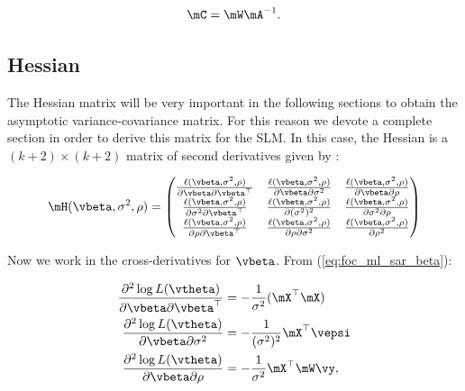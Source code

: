 \documentclass[english,12pt]{book}\usepackage[]{graphicx}\usepackage[]{xcolor}
\begin{document}
\begin{equation}\label{eq:Cmatrix}
  \mC = \mW\mA^{-1}.
\end{equation}

\subsection{Hessian}

The Hessian matrix will be very important in the following sections to obtain the asymptotic variance-covariance matrix. For this reason we devote a complete section in order to derive this matrix for the SLM. In this case, the Hessian is a $(k + 2)\times (k + 2)$ matrix of second derivatives given by :

\begin{equation*}
	\mH(\vbeta, \sigma^2, \rho) = 
	\begin{pmatrix}
		\frac{\ell(\vbeta, \sigma^2,\rho)}{\partial \vbeta \partial \vbeta^\top} & \frac{\ell(\vbeta, \sigma^2,\rho)}{\partial \vbeta \partial \sigma^2} & \frac{\ell(\vbeta, \sigma^2,\rho)}{\partial \vbeta \partial \rho} \\
		\frac{\ell(\vbeta, \sigma^2,\rho)}{\partial \sigma^2 \partial \vbeta^\top} & \frac{\ell(\vbeta, \sigma^2,\rho)}{\partial (\sigma^2)^2} & \frac{\ell(\vbeta, \sigma^2,\rho)}{\partial \sigma^2 \partial \rho} \\
		\frac{\ell(\vbeta, \sigma^2,\rho)}{\partial \rho \partial \vbeta^\top} & \frac{\ell(\vbeta, \sigma^2,\rho)}{\partial \rho \partial \sigma^2} & \frac{\ell(\vbeta, \sigma^2,\rho)}{\partial \rho^2}
	\end{pmatrix} 
\end{equation*}

Now we work in the cross-derivatives for $\vbeta$. From (\ref{eq:foc_ml_sar_beta}):

\begin{align}
  \frac{\partial^2 \log L(\vtheta)}{\partial \vbeta \partial \vbeta^\top}  & =  - \frac{1}{\sigma^2}(\mX^\top \mX) \label{eq:sar_der_beta_beta} \\
  \frac{\partial^2  \log L(\vtheta)}{\partial \vbeta \partial \sigma^2} &= - \frac{1}{(\sigma^2)^2} \mX^\top \vepsi\label{eq:sar_der_beta_sigma} \\
  \frac{\partial^2  \log L(\vtheta)}{\partial \vbeta \partial \rho}  & =  - \frac{1}{\sigma^2} \mX^\top \mW\vy\label{eq:sar_der_beta_rho},
\end{align}
\end{document}
